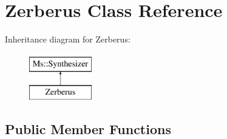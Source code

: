 \hypertarget{class_zerberus}{}\section{Zerberus Class Reference}
\label{class_zerberus}
Inheritance diagram for Zerberus\+:\begin{figure}[H]
\begin{center}
\leavevmode
\includegraphics[height=2.000000cm]{class_zerberus}
\end{center}
\end{figure}
\subsection*{Public Member Functions}
